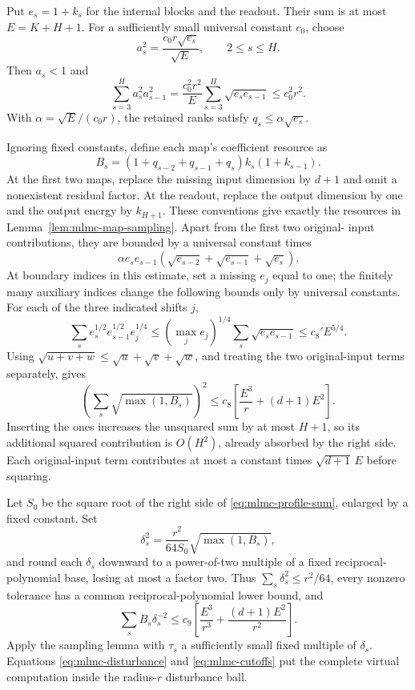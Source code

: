 Put $e_s=1+k_s$ for the internal blocks and the readout. Their sum is
at most $E=K+H+1$. For a sufficiently small universal constant $c_0$,
choose
\begin{equation}\label{eq:mlmc-cutoffs}
 a_s^2=\frac{c_0r\sqrt{e_s}}{\sqrt E},\qquad 2\le s\le H.
\end{equation}
Then $a_s<1$ and
\[
 \sum_{s=3}^H a_s^2a_{s-1}^2
 =\frac{c_0^2r^2}{E}\sum_{s=3}^H\sqrt{e_se_{s-1}}
 \le c_0^2r^2.
\]
With $\alpha=\sqrt E/(c_0r)$, the retained ranks satisfy
$q_s\le\alpha\sqrt{e_s}$.

Ignoring fixed constants, define each map's coefficient resource as
\begin{equation}\label{eq:mlmc-profile-resource}
 B_s=(1+q_{s-2}+q_{s-1}+q_s)k_s(1+k_{s-1}).
\end{equation}
At the first two maps, replace the missing input dimension by $d+1$
and omit a nonexistent residual factor. At the readout, replace the
output dimension by one and the output energy by $k_{H+1}$. These
conventions give exactly the resources in
Lemma~\ref{lem:mlmc-map-sampling}. Apart from the first two original-
input contributions, they are bounded by a universal constant times
\[
 \alpha e_se_{s-1}
    (\sqrt{e_{s-2}}+\sqrt{e_{s-1}}+\sqrt{e_s}).
\]
At boundary indices in this estimate, set a missing $e_j$ equal to one;
the finitely many auxiliary indices change the following bounds only
by universal constants.
For each of the three indicated shifts $j$,
\[
 \sum_s e_s^{1/2}e_{s-1}^{1/2}e_j^{1/4}
 \le(\max_j e_j)^{1/4}\sum_s\sqrt{e_se_{s-1}}
 \le c_8' E^{5/4}.
\]
Using $\sqrt{u+v+w}\le\sqrt u+\sqrt v+\sqrt w$, and treating the
two original-input terms separately, gives
\begin{equation}\label{eq:mlmc-profile-sum}
 \left(\sum_s\sqrt{\max(1,B_s)}\right)^2
 \le c_8\left[\frac{E^3}{r}+(d+1)E^2\right].
\end{equation}
Inserting the ones increases the unsquared sum by at most $H+1$,
so its additional squared contribution is $O(H^2)$, already absorbed
by the right side. Each original-input term contributes at most a constant
times $\sqrt{d+1}\,E$ before squaring.

Let $S_0$ be the square root of the right side of
\eqref{eq:mlmc-profile-sum}, enlarged by a fixed constant. Set
\[
 \delta_s^2=\frac{r^2}{64S_0}\sqrt{\max(1,B_s)},
\]
and round each $\delta_s$ downward to a power-of-two multiple of a fixed
reciprocal-polynomial base, losing at most a factor two. Thus
$\sum_s\delta_s^2\le r^2/64$, every nonzero tolerance has a common
reciprocal-polynomial lower bound, and
\begin{equation}\label{eq:mlmc-total-work}
 \sum_s B_s\delta_s^{-2}
 \le c_9\left[\frac{E^3}{r^3}
                    +\frac{(d+1)E^2}{r^2}\right].
\end{equation}
Apply the sampling lemma with $\tau_s$ a sufficiently small fixed
multiple of $\delta_s$. Equations \eqref{eq:mlmc-disturbance} and
\eqref{eq:mlmc-cutoffs} put the complete virtual computation inside
the radius-$r$ disturbance ball.

